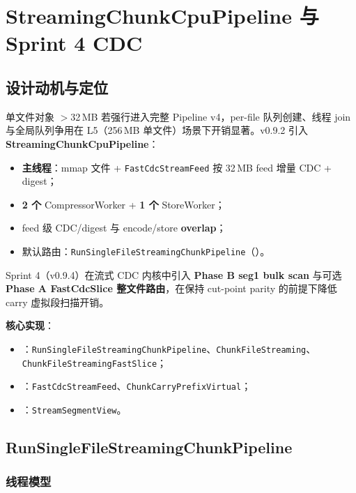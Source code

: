 \chapter{StreamingChunkCpuPipeline 与 Sprint 4 CDC}
\label{ch:streaming-cdc-v4}

\section{设计动机与定位}

单文件对象 $>$32\,MB 若强行进入完整 Pipeline v4，per-file 队列创建、线程 join 与全局队列争用在 L5（256\,MB 单文件）场景下开销显著。v0.9.2 引入 \textbf{StreamingChunkCpuPipeline}：
\begin{itemize}[nosep]
  \item \textbf{主线程}：mmap 文件 + \texttt{FastCdcStreamFeed} 按 32\,MB feed 增量 CDC + digest；
  \item \textbf{2 个} CompressorWorker + \textbf{1 个} StoreWorker；
  \item feed 级 CDC/digest 与 encode/store \textbf{overlap}；
  \item 默认路由：\texttt{RunSingleFileStreamingChunkPipeline}（）。
\end{itemize}

Sprint 4（v0.9.4）在流式 CDC 内核中引入 \textbf{Phase B seg1 bulk scan} 与可选 \textbf{Phase A FastCdcSlice 整文件路由}，在保持 cut-point parity 的前提下降低 carry 虚拟段扫描开销。

\textbf{核心实现}：
\begin{itemize}[nosep]
  \item {}：\texttt{RunSingleFileStreamingChunkPipeline}、\texttt{ChunkFileStreaming}、\texttt{ChunkFileStreamingFastSlice}；
  \item {}：\texttt{FastCdcStreamFeed}、\texttt{ChunkCarryPrefixVirtual}；
  \item {}：\texttt{StreamSegmentView}。
\end{itemize}

\section{RunSingleFileStreamingChunkPipeline}

\subsection{线程模型}

